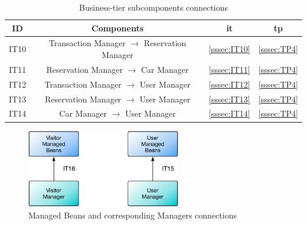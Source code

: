 \begin{table}[htbp]
\begin{center}
\begin{tabular}[t]{cccc}

\hline
\textbf{ID} & \textbf{Components} & \textbf{\acs{it}} & \textbf{\acs{tp}}\\
\hline
IT10 & \enspace Transaction Manager $\rightarrow$ Reservation Manager \enspace & \ref{sssec:IT10} & \ref{sssec:TP4}\\
\hline
IT11 & \enspace Reservation Manager $\rightarrow$ Car Manager \enspace & \ref{sssec:IT11} & \ref{sssec:TP4}\\
\hline
IT12 & \enspace Transaction Manager $\rightarrow$ User Manager \enspace & \ref{sssec:IT12} & \ref{sssec:TP4}\\
\hline
IT13 & \enspace Reservation Manager $\rightarrow$ User Manager \enspace & \ref{sssec:IT13} & \ref{sssec:TP4}\\
\hline
IT14 & \enspace Car Manager $\rightarrow$ User Manager \enspace & \ref{sssec:IT14} & \ref{sssec:TP4}\\
\hline

\end{tabular}
\caption{Business-tier subcomponents connections}
\end{center}
\end{table}

\clearpage

\vspace{120pt}

\begin{figure}[htbp]
\centering
\includegraphics[width=0.6\textwidth]{Images/IT15-16.pdf}
\vspace{16pt}
\caption{Managed Beans and corresponding Managers connections}
\label{fig:it15-16}
\end{figure}

\vspace{16pt}

